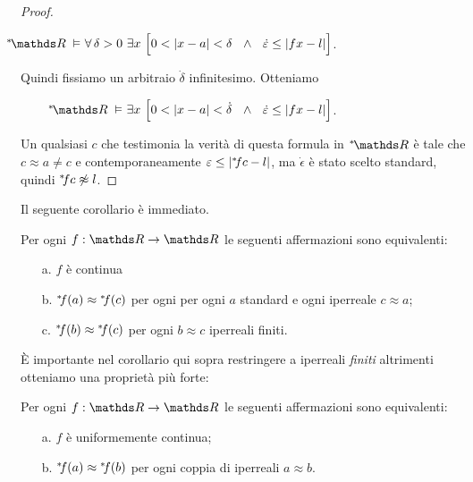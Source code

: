 \begin{proof}
\begin{itemize}
\item[]\hspace*{9ex}$\phantom{\E\,\epsilon>0}\llap{$\nsR\;\models$}\ \A\,\delta>0\ \E x\ \Big[0<|x-a|<\delta\ \ \wedge\ \ \dot\epsilon\le |fx-l|\Big]$.
\end{itemize}

Quindi fissiamo un arbitraio $\dot\delta$ infinitesimo. Otteniamo 

\begin{itemize}
\item[]\hspace*{9ex}$\phantom{\E\,\epsilon>0\ \A\,\delta>0}\llap{$\nsR\;\models$}\ \E x\ \Big[0<|x-a|<\dot\delta\ \ \wedge\ \ \dot\epsilon\le |fx-l|\Big]$.
\end{itemize}

Un qualsiasi $c$ che testimonia la verit\`a di questa formula in $\nsR$ \`e tale che $c\approx a\neq c$ e contemporaneamente $\varepsilon\le |{}^{*\hskip-.5ex} fc-l|$, ma $\dot\epsilon$ \`e stato scelto standard, quindi  ${}^{*\hskip-.5ex} fc\not\approx l$.
\end{proof}

Il seguente corollario \`e immediato.

\begin{corollary} Per ogni $f:\RR\to\RR$ le seguenti affermazioni sono equivalenti:
\begin{itemize}
\item[a.] $f$ \`e continua
\item[b.] ${}^{*\hskip-.5ex} f(a)\approx {}^{*\hskip-.5ex} f(c)$ per ogni per ogni $a$ standard e ogni iperreale $c\approx a$;
\item[c.] ${}^{*\hskip-.5ex} f(b)\approx {}^{*\hskip-.5ex} f(c)$ per ogni $b\approx c$ iperreali finiti.\QED
\end{itemize}
\end{corollary}

\`E importante nel corollario qui sopra restringere  a iperreali \textit{finiti\/} altrimenti otteniamo una propriet\`a pi\`u forte:

\begin{proposition} Per ogni $f:\RR\to\RR$ le seguenti affermazioni sono equivalenti:
\begin{itemize}
\item[a.] $f$ \`e uniformemente continua;
\item[b.] ${}^{*\hskip-.5ex} f(a)\approx{}^{*\hskip-.5ex}  f(b)$ per ogni coppia di iperreali $a\approx b$.
\end{itemize}
\end{proposition}

